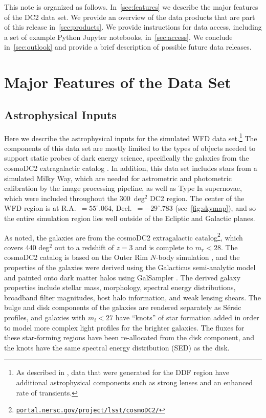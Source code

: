 \documentclass[modern]{descnote}
\newcommand*{\https}[1]{\href{https://#1}{\nolinkurl{#1}}}
\begin{document}
This note is organized as follows. In~\autoref{sec:features} we describe the major features of the DC2 data set. We provide an overview of the data products that are part of this release in~\autoref{sec:products}. We provide instructions for data access, including a set of example Python Jupyter notebooks, in~\autoref{sec:access}. We conclude in~\autoref{sec:outlook} and provide a brief description of possible future data releases. 

\section{Major Features of the Data Set}
\label{sec:features}

\subsection{Astrophysical Inputs}

Here we describe the astrophysical inputs for the simulated WFD data set.\footnote{As described in \cite{2020arXiv201005926L}, data that were generated for the DDF region have additional astrophysical components such as strong lenses and an enhanced rate of transients.}  The components of this data set are mostly limited to the types of objects needed to support static probes of dark energy science, specifically the galaxies from the cosmoDC2 extragalactic catalog \citep{korytov}.  In addition, this data set includes stars from a simulated Milky Way, which are needed for astrometric and photometric calibration by the image processing pipeline, as well as Type Ia supernovae, which were included throughout the 300~deg$^2$ DC2 region.  The center of the WFD region is at R.A.~$= 55^\circ\!\!.064$, Decl.~$= -29^\circ\!\!.783$ (see~\autoref{fig:skymap}), and so the entire simulation region lies well outside of the Ecliptic and Galactic planes.

As noted, the galaxies are from the cosmoDC2 extragalactic catalog\footnote{ \https{portal.nersc.gov/project/lsst/cosmoDC2/}}, which covers 440 deg$^2$ out to a redshift of $z = 3$ and is complete to $m_r <28$.  The cosmoDC2 catalog is based on the Outer Rim $N$-body simulation \citep{2019ApJS..245...16H}, and the properties of the galaxies were derived using the Galacticus semi-analytic model \citep{benson_2010b} and painted onto dark matter halos using GalSampler \citep{2020MNRAS.495.5040H}.  The derived galaxy properties include stellar mass, morphology, spectral energy distributions, broadband filter magnitudes, host halo information, and weak lensing shears.   The bulge and disk components of the galaxies are rendered separately as S\'ersic profiles, and galaxies with $m_i < 27$ have ``knots'' of star formation added in order to model more complex light profiles for the brighter galaxies. The fluxes for these star-forming regions have been re-allocated from the disk component, and the knots have the same spectral energy distribution (SED) as the disk.
\end{document}
